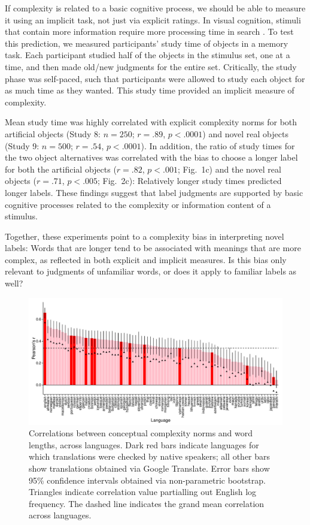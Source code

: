 \documentclass[12pt]{article}
\begin{document}
If complexity is related to a basic cognitive process, we should be able to measure it using an implicit task, not just via explicit ratings. In visual cognition, stimuli that contain more information require more processing time in search \cite{alvarez2004capacity, hyman}. To test this prediction, we measured participants' study time of objects in a memory task. Each participant studied half of the objects in the stimulus set, one at a time, and then made old/new judgments for the entire set. Critically, the study phase was self-paced, such that participants were allowed to study each object for as much time as they wanted. This study time provided an implicit measure of complexity.
					
Mean study time was highly correlated with explicit complexity norms for both artificial objects (Study 8: $n = 250$; $r = .89$, $p < .0001$) and novel real objects (Study 9: $n = 500$; $r = .54$, $p < .0001$). In addition, the ratio of study times for the two object alternatives was correlated with the bias to choose a longer label for both the artificial objects ($r = .82$, $p < .001$; Fig.\ 1c) and the novel real objects ($r = .71$, $p < .005$; Fig.\ 2c): Relatively longer study times predicted longer labels. These findings suggest that label judgments are supported by basic cognitive processes related to the complexity or information content of a stimulus. 
					
Together, these experiments point to a complexity bias in interpreting novel labels: Words that are longer tend to be associated with meanings that are more complex, as reflected in both explicit and implicit measures. Is this bias only relevant to judgments of unfamiliar words, or does it apply to familiar labels as well? 

\begin{figure}[ht!]
\begin{center}
\includegraphics[scale = .53]{figs/FIG_3.pdf}
\caption{Correlations between conceptual complexity norms and word lengths, across languages. Dark red bars indicate languages for which translations were checked by native speakers; all other bars show translations obtained via Google Translate. Error bars show 95\% confidence intervals obtained via non-parametric bootstrap. Triangles indicate correlation value partialling out English log frequency. The dashed line indicates the grand mean correlation across languages.} 
\end{center}
\label{fig:real_objs}
\end{figure}
\end{document}

